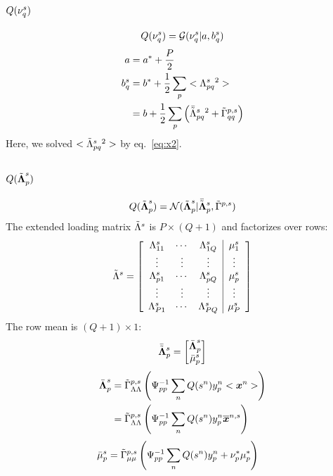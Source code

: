 \documentclass[a4paper]{article}
\begin{document}
\subsection{$Q(\nu^s_q)$}
\begin{align}
 Q(\nu^s_q)=\mathcal{G}(\nu^s_q|a, b_q^s)
\end{align}
\begin{align}
a&=a^*+\frac{P}{2} \\
b_q^s&=b^*+\frac{1}{2}\sum_p<\Lambda^s_{pq}{}^2> \\
&=b+\frac{1}{2}\sum_p\left(\bar{\tilde{\Lambda}}^s_{pq}{}^2 + \tilde{\Gamma}^{p,s}_{qq}\right)
\end{align}
Here, we solved $<\tilde{\Lambda}^s_{pq}{}^2>$ by eq.~\ref{eq:x2}.

\subsection{$Q(\tilde{\boldsymbol{\Lambda}}^s_p)$}
\begin{align}
  Q(\tilde{\boldsymbol{\Lambda}}^s_p)=\mathcal{N}(\tilde{\boldsymbol{\Lambda}}^s_p|\bar{\tilde{\boldsymbol{\Lambda}}}^s_p,\tilde{\Gamma}^{p,s})
\end{align}
The extended loading matrix $\tilde{\Lambda}^s$ is $P\times (Q+1)$ and factorizes over rows:
\begin{align}
  \tilde{\Lambda}^s=\left[
    \begin{array}{ccc|c}
      \Lambda^s_{11} & \cdots & \Lambda^s_{1Q} & \mu^s_1 \\
      \vdots & \vdots & \vdots & \vdots \\
      \Lambda^s_{p1} & \cdots & \Lambda^s_{pQ} & \mu^s_p \\
      \vdots & \vdots & \vdots & \vdots \\
      \Lambda^s_{P1} & \cdots & \Lambda^s_{PQ} & \mu^s_P
    \end{array}
  \right]
\end{align}
The row mean is $(Q+1)\times 1$:
\begin{align}
  \bar{\tilde{\boldsymbol{\Lambda}}}^s_p=\begin{bmatrix}
    \bar{\boldsymbol{\Lambda}}^s_p \\
    \bar{\mu}^s_p
  \end{bmatrix}
\end{align}
\begin{align}
  \bar{\boldsymbol{\Lambda}}^s_p
  &=\tilde{\Gamma}^{p,s}_{\Lambda\Lambda}\left(\Psi^{-1}_{pp}\sum_n Q(s^n)y^n_p<\boldsymbol{x}^n>\right) \\
  &=\tilde{\Gamma}^{p,s}_{\Lambda\Lambda}\left(\Psi^{-1}_{pp}\sum_n Q(s^n)y^n_p\overline{\boldsymbol{x}}^{n,s}\right)
\end{align}
\begin{align}
  \bar{\mu}^s_p
  &=\tilde{\Gamma}^{p,s}_{\mu\mu}\left(\Psi^{-1}_{pp}\sum_n Q(s^n)y^n_p+\nu^*_p\mu^*_p\right)
\end{align}
\end{document}
